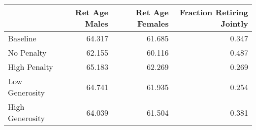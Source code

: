\begin{tabular}{lrrr}
\toprule
{} & Ret Age Males & Ret Age Females & Fraction Retiring Jointly \\
\midrule
Baseline        &        64.317 &          61.685 &                     0.347 \\
No Penalty      &        62.155 &          60.116 &                     0.487 \\
High Penalty    &        65.183 &          62.269 &                     0.269 \\
Low Generosity  &        64.741 &          61.935 &                     0.254 \\
High Generosity &        64.039 &          61.504 &                     0.381 \\
\bottomrule
\end{tabular}
